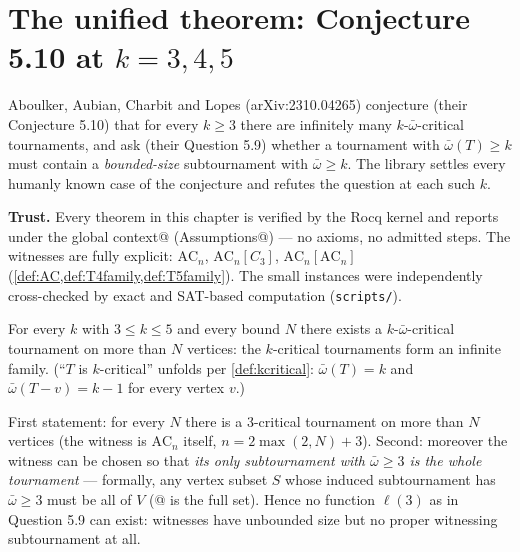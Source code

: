 \chapter{The unified theorem: Conjecture 5.10 at $k = 3, 4, 5$}
\label{ch:unified}

Aboulker, Aubian, Charbit and Lopes (arXiv:2310.04265) conjecture
(their Conjecture 5.10) that for every $k \ge 3$ there are infinitely
many $k$-$\bar\omega$-critical tournaments, and ask (their Question
5.9) whether a tournament with $\bar\omega(T) \ge k$ must contain a
\emph{bounded-size} subtournament with $\bar\omega \ge k$. The library
settles every humanly known case of the conjecture and refutes the
question at each such $k$.

\begin{trustbox}
\noindent\textbf{Trust.} Every theorem in this chapter is verified by
the Rocq kernel and reports
\rocqinline@Closed under the global context@
(\rocqinline@Print Assumptions@) --- no axioms, no admitted steps. The
witnesses are fully explicit: $\mathrm{AC}_n$,
$\mathrm{AC}_n[C_3]$, $\mathrm{AC}_n[\mathrm{AC}_n]$
(\cref{def:AC,def:T4family,def:T5family}). The small instances were
independently cross-checked by exact and SAT-based computation
(\texttt{scripts/}).
\end{trustbox}




\begin{decoded}
For every $k$ with $3 \le k \le 5$ and every bound $N$ there exists a
$k$-$\bar\omega$-critical tournament on more than $N$ vertices: the
$k$-critical tournaments form an infinite family. (``$T$ is
$k$-critical'' unfolds per \cref{def:kcritical}: $\bar\omega(T) = k$
and $\bar\omega(T - v) = k - 1$ for every vertex $v$.)
\end{decoded}






\label{res:question_5_9_fails_at_k3}

\begin{decoded}
First statement: for every $N$ there is a 3-critical tournament on
more than $N$ vertices (the witness is $\mathrm{AC}_n$ itself,
$n = 2\max(2,N){+}3$). Second: moreover the witness can be chosen so
that \emph{its only subtournament with $\bar\omega \ge 3$ is the whole
tournament} --- formally, any vertex subset $S$ whose induced
subtournament has $\bar\omega \ge 3$ must be all of $V$
(\rocqinline@[set: T]@ is the full set). Hence no function
$\ell(3)$ as in Question 5.9 can exist: witnesses have unbounded size
but no proper witnessing subtournament at all.
\end{decoded}

